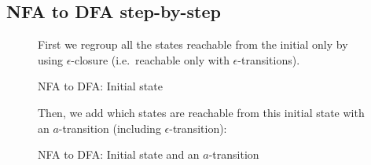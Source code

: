 \documentclass[a4paper, 11pt]{article}
\begin{document}
    \subsection{NFA to DFA step-by-step}

    \begin{figure}[!ht]
    \begin{minipage}{\linewidth}
        \begin{minipage}[t]{0.45\linewidth}

    First we regroup all the states reachable from the initial only by using
    $\epsilon$-closure (i.e.\ reachable only with $\epsilon$-transitions).

        \begin{center}
        \caption{NFA to DFA\@: Initial state}
        \end{center}

        \end{minipage}
        \begin{minipage}[t]{0.08\linewidth}
            \vrule{}
        \end{minipage}
        \begin{minipage}[t]{0.45\linewidth}

    Then, we add which states are reachable from this initial state with an
    $a$-transition (including $\epsilon$-transition):

        \begin{center}
        \caption{NFA to DFA\@: Initial state and an $a$-transition}
        \end{center}
    \FloatBarrier

        \end{minipage}
    \end{minipage}
    \end{figure}
    \FloatBarrier{}
\end{document}
